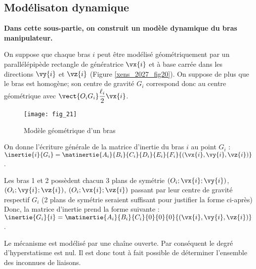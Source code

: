  \subsection{Modélisaton dynamique}

\ifprof
\else
\textbf{Dans cette sous-partie, on construit un modèle dynamique du bras manipulateur.}

On suppose que chaque bras $i$ peut être modélisé géométriquement par un parallélépipède
 rectangle de génératrice $\vx{i}$ et à base carrée dans les directions $\vy{i}$ et $\vz{i}$ (Figure \ref{xens_2027_fig20}). On
 suppose de plus que le bras est homogène; son centre de gravité $G_i$ correspond donc au centre
 géométrique avec $\vect{O_iG_i} \dfrac{\ell_i}{2} \vx{i}$.
 

\begin{figure}[!h]
\centering
\texttt{[image: fig\_21]}
\caption{Modèle géométrique d'un bras \label{xens_2027_fig21}}
\end{figure}



On donne l'écriture générale de la matrice d'inertie du bras $i$ au point $G_i$ : 
$\inertie{i}{G_i} = \matinertie{A_i}{B_i}{C_i}{D_i}{E_i}{F_i}{\left( \vx{i},\vy{i},\vz{i}\right)}$.
\fi



  \ifprof
 \begin{corrige}
 Les bras 1 et 2 possèdent chacun 3 plans de symétrie $\left(O_i;\vx{i}; \vy{i}\right)$, $\left(O_i;\vy{i}; \vz{i}\right)$, $\left(O_i;\vx{i}; \vz{i}\right)$ passant par leur centre de gravité respectif $G_i$ (2 plans de symétrie seraient suffisant pour justifier la forme ci-après)
Donc, la matrice d’inertie prend la forme suivante : 
$\inertie{G_i}{i} =\matinertie{A_i}{B_i}{C_i}{0}{0}{0}{\left(\vx{i},\vy{i},\vz{i}\right)}$.

 \end{corrige}
 \else
 \fi
 
 \ifprof
 \begin{corrige}
 Le mécanisme est modélisé par une chaîne ouverte. Par conséquent le degré d’hyperstatisme est nul. Il est donc tout à fait possible de déterminer l’ensemble des inconnues de liaisons.
 \end{corrige}
 \else
 \fi

